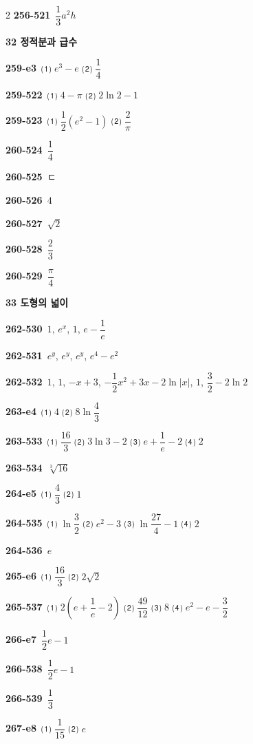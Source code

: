 \documentclass[10pt,a4paper]{article}
\begin{document}
\begin{multicols}{2}
\noindent\textbf{256-521}\ $\dfrac{1}{3}a^2h$\par
\noindent\textbf{32 정적분과 급수}\par\smallskip
\noindent\textbf{259-e3}\ ⑴ $e^3-e$ ⑵ $\dfrac{1}{4}$\par
\noindent\textbf{259-522}\ ⑴ $4-\pi$ ⑵ $2\ln 2-1$\par
\noindent\textbf{259-523}\ ⑴ $\dfrac{1}{2}(e^2-1)$ ⑵ $\dfrac{2}{\pi}$\par
\noindent\textbf{260-524}\ $\dfrac{1}{4}$\par
\noindent\textbf{260-525}\ ㄷ\par
\noindent\textbf{260-526}\ $4$\par
\noindent\textbf{260-527}\ $\sqrt{2}$\par
\noindent\textbf{260-528}\ $\dfrac{2}{3}$\par
\noindent\textbf{260-529}\ $\dfrac{\pi}{4}$\par
\noindent\textbf{33 도형의 넓이}\par\smallskip
\noindent\textbf{262-530}\ $1$, $e^x$, $1$, $e-\dfrac{1}{e}$\par
\noindent\textbf{262-531}\ $e^y$, $e^y$, $e^y$, $e^4-e^2$\par
\noindent\textbf{262-532}\ $1$, $1$, $-x+3$, $-\dfrac{1}{2}x^2+3x-2\ln|x|$, $1$, $\dfrac{3}{2}-2\ln 2$\par
\noindent\textbf{263-e4}\ ⑴ $4$ ⑵ $8\ln\dfrac{4}{3}$\par
\noindent\textbf{263-533}\ ⑴ $\dfrac{16}{3}$ ⑵ $3\ln 3-2$ ⑶ $e+\dfrac{1}{e}-2$ ⑷ $2$\par
\noindent\textbf{263-534}\ $\sqrt[3]{16}$\par
\noindent\textbf{264-e5}\ ⑴ $\dfrac{4}{3}$ ⑵ $1$\par
\noindent\textbf{264-535}\ ⑴ $\ln\dfrac{3}{2}$ ⑵ $e^2-3$ ⑶ $\ln\dfrac{27}{4}-1$ ⑷ $2$\par
\noindent\textbf{264-536}\ $e$\par
\noindent\textbf{265-e6}\ ⑴ $\dfrac{16}{3}$ ⑵ $2\sqrt{2}$\par
\noindent\textbf{265-537}\ ⑴ $2\left(e+\dfrac{1}{e}-2\right)$ ⑵ $\dfrac{49}{12}$ ⑶ $8$ ⑷ $e^2-e-\dfrac{3}{2}$\par
\noindent\textbf{266-e7}\ $\dfrac{1}{2}e-1$\par
\noindent\textbf{266-538}\ $\dfrac{1}{2}e-1$\par
\noindent\textbf{266-539}\ $\dfrac{1}{3}$\par
\noindent\textbf{267-e8}\ ⑴ $\dfrac{1}{15}$ ⑵ $e$\par

\end{multicols}
\end{document}
